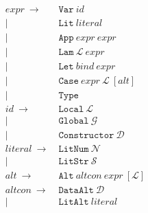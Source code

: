 
\newcommand{\CVar}{\texttt{Var}}
\newcommand{\CLit}{\texttt{Lit}}
\newcommand{\CApp}{\texttt{App}}
\newcommand{\CLam}{\texttt{Lam}}
\newcommand{\CLet}{\texttt{Let}}
\newcommand{\CCase}{\texttt{Case}}
\newcommand{\CType}{\texttt{Type}}
\newcommand{\CLocal}{\texttt{Local}}
\newcommand{\CGlobal}{\texttt{Global}}
\newcommand{\CConstructor}{\texttt{Constructor}}
\newcommand{\CLitNum}{\texttt{LitNum}}
\newcommand{\CLitStr}{\texttt{LitStr}}
\newcommand{\CAlt}{\texttt{Alt}}
\newcommand{\CDataAlt}{\texttt{DataAlt}}
\newcommand{\CLitAlt}{\texttt{LitAlt}}
\newcommand{\CDefault}{\texttt{Default}}
\newcommand{\CNonRec}{\texttt{NonRec}}
\newcommand{\CRec}{\texttt{Rec}}
\newcommand{\CBind}{\texttt{Bind}}

\begin{figure}
  \begin{equation*}
    \begin{split}
      expr\    \rightarrow\ & \CVar\ id                          \\
                         |\ & \CLit\ literal                     \\
                         |\ & \CApp\ expr\ expr                  \\
                         |\ & \CLam\ \mathcal{L}\ expr           \\
                         |\ & \CLet\ bind\ expr                  \\
                         |\ & \CCase\ expr\ \mathcal{L}\ [alt]   \\
                         |\ & \CType                             \\
      id\      \rightarrow\ & \CLocal\       \mathcal{L}         \\
                         |\ & \CGlobal\      \mathcal{G}         \\
                         |\ & \CConstructor\ \mathcal{D}         \\
      literal\ \rightarrow\ & \CLitNum\ \mathcal{N}              \\
                         |\ & \CLitStr\ \mathcal{S}              \\
      alt\     \rightarrow\ & \CAlt\ altcon\ expr\ [\mathcal{L}] \\
      altcon\  \rightarrow\ & \CDataAlt\ \mathcal{D}             \\
                         |\ & \CLitAlt\ literal                  \\

\end{split}
\end{equation*}
\end{figure}
